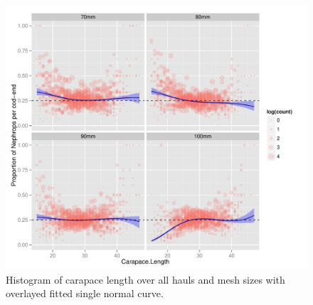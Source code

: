 \documentclass[12pt]{article}\usepackage[]{graphicx}\usepackage[]{color}
\makeatletter
\def\maxwidth{ %
  \ifdim\Gin@nat@width>\linewidth
    \linewidth
  \else
    \Gin@nat@width
  \fi
}
\newenvironment{knitrout}{}{} %
\makeatother
\begin{document}
\begin{knitrout}
\begin{figure}
{\centering \includegraphics[width=\maxwidth]{figure/unnamed-chunk-7-1} 

}

\caption[Histogram of carapace length over all hauls and mesh sizes with overlayed fitted single normal curve]{Histogram of carapace length over all hauls and mesh sizes with overlayed fitted single normal curve.}\label{fig:unnamed-chunk-7}
\end{figure}


\end{knitrout}
\end{document}
